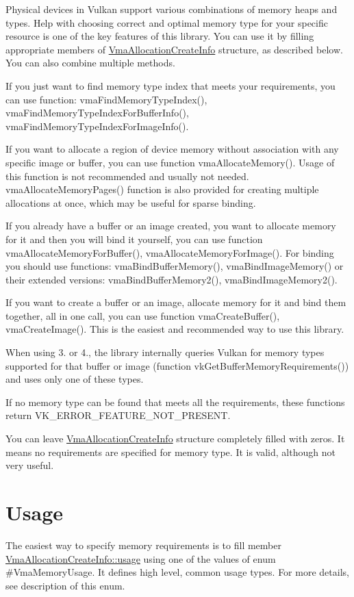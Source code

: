 Physical devices in Vulkan support various combinations of memory heaps and types. Help with choosing correct and optimal memory type for your specific resource is one of the key features of this library. You can use it by filling appropriate members of \hyperlink{structVmaAllocationCreateInfo}{Vma\+Allocation\+Create\+Info} structure, as described below. You can also combine multiple methods.


\begin{DoxyEnumerate}
\item If you just want to find memory type index that meets your requirements, you can use function\+: vma\+Find\+Memory\+Type\+Index(), vma\+Find\+Memory\+Type\+Index\+For\+Buffer\+Info(), vma\+Find\+Memory\+Type\+Index\+For\+Image\+Info().
\item If you want to allocate a region of device memory without association with any specific image or buffer, you can use function vma\+Allocate\+Memory(). Usage of this function is not recommended and usually not needed. vma\+Allocate\+Memory\+Pages() function is also provided for creating multiple allocations at once, which may be useful for sparse binding.
\item If you already have a buffer or an image created, you want to allocate memory for it and then you will bind it yourself, you can use function vma\+Allocate\+Memory\+For\+Buffer(), vma\+Allocate\+Memory\+For\+Image(). For binding you should use functions\+: vma\+Bind\+Buffer\+Memory(), vma\+Bind\+Image\+Memory() or their extended versions\+: vma\+Bind\+Buffer\+Memory2(), vma\+Bind\+Image\+Memory2().
\item If you want to create a buffer or an image, allocate memory for it and bind them together, all in one call, you can use function vma\+Create\+Buffer(), vma\+Create\+Image(). This is the easiest and recommended way to use this library.
\end{DoxyEnumerate}

When using 3. or 4., the library internally queries Vulkan for memory types supported for that buffer or image (function {\ttfamily vk\+Get\+Buffer\+Memory\+Requirements()}) and uses only one of these types.

If no memory type can be found that meets all the requirements, these functions return {\ttfamily V\+K\+\_\+\+E\+R\+R\+O\+R\+\_\+\+F\+E\+A\+T\+U\+R\+E\+\_\+\+N\+O\+T\+\_\+\+P\+R\+E\+S\+E\+NT}.

You can leave \hyperlink{structVmaAllocationCreateInfo}{Vma\+Allocation\+Create\+Info} structure completely filled with zeros. It means no requirements are specified for memory type. It is valid, although not very useful.\hypertarget{choosing_memory_type_choosing_memory_type_usage}{}\section{Usage}\label{choosing_memory_type_choosing_memory_type_usage}
The easiest way to specify memory requirements is to fill member \hyperlink{structVmaAllocationCreateInfo_accb8b06b1f677d858cb9af20705fa910}{Vma\+Allocation\+Create\+Info\+::usage} using one of the values of enum \#\+Vma\+Memory\+Usage. It defines high level, common usage types. For more details, see description of this enum.


